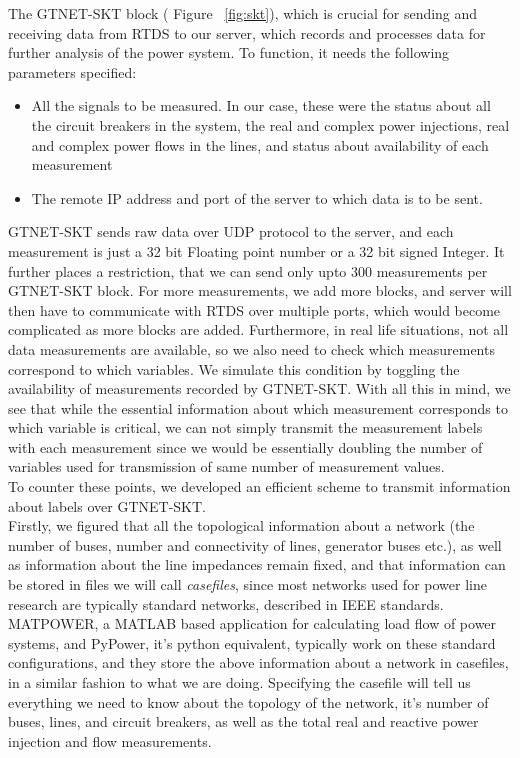 The GTNET-SKT block ( Figure ~\ref{fig:skt}), which is crucial for sending and receiving data from RTDS to our server, which records and processes data for further analysis of the power system.  To function, it needs the following parameters specified:
\begin{itemize}
\item All the signals to be measured. In our case, these were the status about all the circuit breakers in the system, the real and complex power injections, real and complex power flows in the lines, and status about availability of each measurement
\item The remote IP address and port of the server to which data is to be sent. 
\end{itemize}
GTNET-SKT sends raw data over UDP protocol to the server, and each measurement is just a 32 bit Floating point number or a 32 bit signed Integer. 
It further places a restriction, that we can send only upto 300 measurements per GTNET-SKT block. For more measurements, we add more blocks, and server will then have to communicate with RTDS over multiple ports, which would become complicated as more blocks are added. 
Furthermore, in real life situations, not all data measurements are available, so we also need to check which measurements correspond to which variables. We simulate this condition by toggling the availability of measurements recorded by GTNET-SKT. 
With all this in mind, we see that while the essential information about which measurement corresponds to which variable is critical, we can not simply transmit the measurement labels with each measurement since we would be essentially doubling the number of variables used for transmission of same number of measurement values.\\
To counter these points, we developed an efficient scheme to transmit information about labels over GTNET-SKT.
\\Firstly, we figured that all the topological information about a network (the number of buses, number and connectivity of lines, generator buses etc.), as well as information about the line impedances remain fixed, and that information can be stored in files we will call \emph{casefiles}, since most networks used for power line research are typically standard networks, described in IEEE standards. MATPOWER, a MATLAB based application for calculating load flow of power systems, and PyPower, it's python equivalent, typically work on these standard configurations, and they store the above information about a network in casefiles, in a similar fashion to what we are doing. Specifying the casefile will tell us everything we need to know about the topology of the network, it's number of buses, lines, and circuit breakers, as well as the total real and reactive power injection and flow measurements.\\
